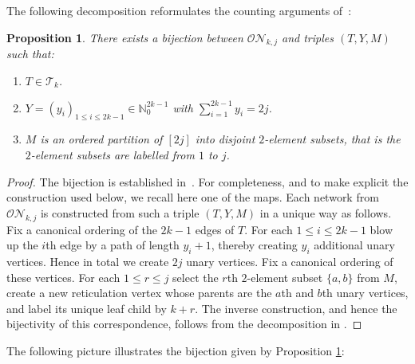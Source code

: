 \documentclass[english,11pt]{smfart}
\newcommand{\ndN}{\mathbb{N}}
\newcommand{\cN}{\mathcal{N}}
\newcommand{\cO}{\mathcal{O}}
\newcommand{\cT}{\mathcal{T}}
\newtheorem{proposition}[theorem]{Proposition}
\numberwithin{equation}{section}
\begin{document}
The following decomposition reformulates the counting arguments of~\cite{zbMATH07244280}:
\begin{proposition}
	\label{pro:tt}
	There exists a bijection between $\cO\cN_{k,j}$ and triples $(T, Y, M)$ such that:
	\begin{enumerate}
		\item  $T \in \cT_k$.
		\item $Y = (y_i)_{1 \le i \le 2k-1} \in \ndN_0^{2k-1}$ with $\sum_{i=1}^{2k-1} y_i = 2j$.
		\item $M$ is an ordered partition of $[2j]$ into disjoint $2$-element subsets, that is the $2$-element subsets are labelled from $1$ to $j$.
	\end{enumerate}
\end{proposition}
\begin{proof}
	The bijection is established in~\cite{zbMATH07244280}. For completeness,
and to make explicit the construction used below, we recall here one of the maps. Each network from $\cO\cN_{k,j}$ is constructed from such a triple  $(T, Y, M)$ in a unique way  as follows. Fix a canonical ordering of the  $2k-1$ edges of $T$. For each $1 \le i \le 2k-1$ blow up the $i$th edge by a path of length $y_i+1$, thereby creating $y_i$ additional unary vertices. Hence in total we create $2j$ unary vertices. Fix a canonical ordering of these vertices.  For each $1 \le r \le j$ select the $r$th $2$-element subset $\{a,b\}$ from $M$, create a new reticulation vertex whose parents are the $a$th and $b$th unary vertices, and label its unique leaf child by $k+r$. The inverse construction, and hence the bijectivity of this
correspondence, follows from the decomposition in
\cite{zbMATH07244280}.
\end{proof}
The following picture illustrates the bijection given by Proposition \ref{pro:tt}:
\end{document}
